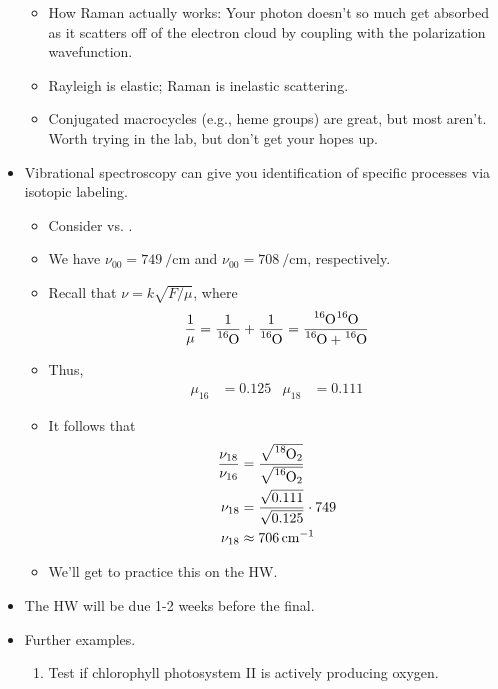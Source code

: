 \documentclass[../notes.tex]{subfiles}
\begin{document}
\begin{itemize}
\begin{itemize}
        \item How Raman actually works: Your photon doesn't so much get absorbed as it scatters off of the electron cloud by coupling with the polarization wavefunction.
        \item Rayleigh is elastic; Raman is inelastic scattering.
        \item Conjugated macrocycles (e.g., heme groups) are great, but most aren't. Worth trying in the lab, but don't get your hopes up.
    \end{itemize}
    \item Vibrational spectroscopy can give you identification of specific processes via isotopic labeling.
    \begin{itemize}
        \item Consider  vs. .
        \item We have $\nu_{00}=\SI{749}{\per\centi\meter}$ and $\nu_{00}=\SI{708}{\per\centi\meter}$, respectively.
        \item Recall that $\nu=k\sqrt{F/\mu}$, where
        \begin{equation*}
            \frac{1}{\mu} = \frac{1}{\ce{{}^16O}}+\frac{1}{\ce{{}^16O}}
            = \frac{\ce{{}^16O}\ce{{}^16O}}{\ce{{}^16O}+\ce{{}^16O}}
        \end{equation*}
        \item Thus,
        \begin{align*}
            \mu_{16} &= 0.125&
            \mu_{18} &= 0.111
        \end{align*}
        \item It follows that
        \begin{align*}
            \frac{\nu_{18}}{\nu_{16}} &= \frac{\sqrt{\ce{{}^18O2}}}{\sqrt{\ce{{}^16O2}}}\\
            \nu_{18} &= \frac{\sqrt{0.111}}{\sqrt{0.125}}\cdot 749\\
            \nu_{18} &\approx \SI{706}{\per\centi\meter}
        \end{align*}
        \item We'll get to practice this on the HW.
    \end{itemize}
    \pagebreak
    \item The HW will be due 1-2 weeks before the final.
    \item Further examples.
    \begin{enumerate}
        \item Test if chlorophyll photosystem II is actively producing oxygen.

\end{enumerate}
\end{itemize}
\end{document}
